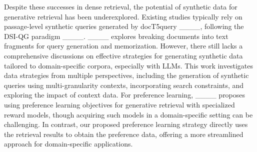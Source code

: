 Despite these successes in dense retrieval, the potential of synthetic data for generative retrieval has been underexplored.
Existing studies typically rely on passage-level synthetic queries generated by docT5query ____, following the DSI-QG paradigm ____.
____ explores breaking documents into text fragments for query generation and memorization. However, there still lacks a comprehensive discussions on effective strategies for generating synthetic data tailored to domain-specific corpora, especially with LLMs.
This work investigates data strategies from multiple perspectives, including the generation of synthetic queries using multi-granularity contexts, incorporating search constraints, and exploring the impact of context data. For preference learning, ____ proposes using preference learning objectives for generative retrieval with specialized reward models, though acquiring such models in a domain-specific setting can be challenging.
In contrast, our proposed preference learning strategy directly uses the retrieval results to obtain the preference data, offering a more streamlined approach for domain-specific applications.